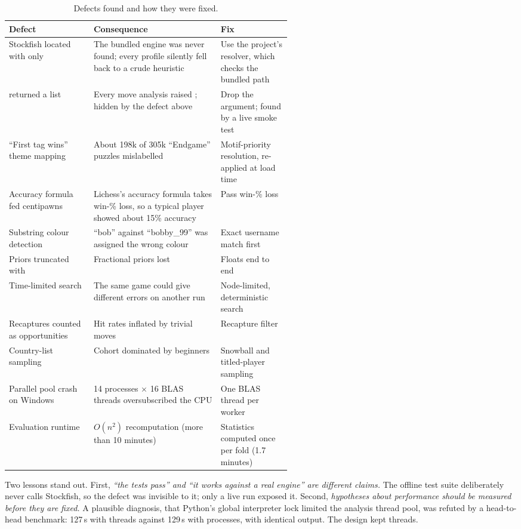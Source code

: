 \begin{table}[H]
\centering
\small
\caption{Defects found and how they were fixed.}\label{tab:defects}
\begin{tabularx}{\linewidth}{p{0.3\linewidth}Yp{0.25\linewidth}}
\toprule
\textbf{Defect} & \textbf{Consequence} & \textbf{Fix} \\
\midrule
Stockfish located with  only & The bundled engine was never found; every profile silently fell back to a crude heuristic & Use the project's resolver, which checks the bundled path \\
 returned a list & Every move analysis raised ; hidden by the defect above & Drop the argument; found by a live smoke test \\
``First tag wins'' theme mapping & About 198k of 305k ``Endgame'' puzzles mislabelled & Motif-priority resolution, re-applied at load time \\
Accuracy formula fed centipawns & Lichess's accuracy formula takes win-\% loss, so a typical player showed about 15\% accuracy & Pass win-\% loss~\cite{lichessaccuracy} \\
Substring colour detection & ``bob'' against ``bobby\_99'' was assigned the wrong colour & Exact username match first \\
Priors truncated with  & Fractional priors lost & Floats end to end \\
Time-limited search & The same game could give different errors on another run & Node-limited, deterministic search \\
Recaptures counted as opportunities & Hit rates inflated by trivial moves & Recapture filter \\
Country-list sampling & Cohort dominated by beginners & Snowball and titled-player sampling \\
Parallel pool crash on Windows & 14 processes $\times$ 16 BLAS threads oversubscribed the CPU & One BLAS thread per worker \\
Evaluation runtime & $O(n^2)$ recomputation (more than 10 minutes) & Statistics computed once per fold (1.7 minutes) \\
\bottomrule
\end{tabularx}
\end{table}

Two lessons stand out. First, \emph{``the tests pass'' and ``it works against a real engine'' are
different claims.} The offline test suite deliberately never calls Stockfish, so the
 defect was invisible to it; only a live run exposed it. Second, \emph{hypotheses about
performance should be measured before they are fixed.} A plausible diagnosis, that Python's global
interpreter lock limited the analysis thread pool, was refuted by a head-to-head benchmark: 127\,s
with threads against 129\,s with processes, with identical output. The design kept threads.
